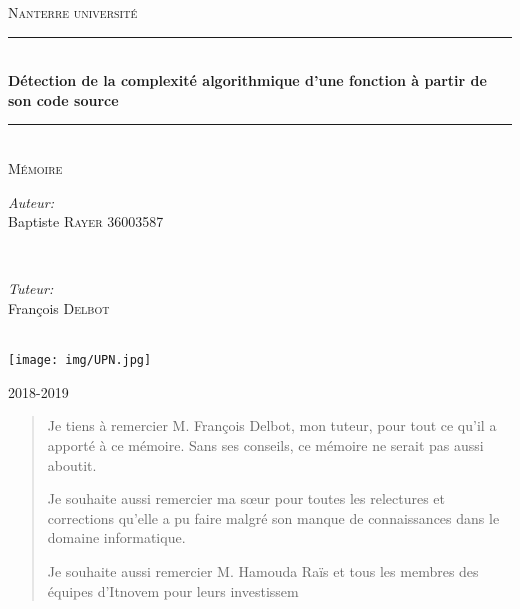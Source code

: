 \documentclass[12pt, twoside, openright]{report}
\begin{document}
\begin{titlepage}

\newcommand{\HRule}{\rule{\linewidth}{0.5mm}} 
\center
 

\textsc{\LARGE Nanterre université}\\[1.5cm]
\HRule \\[0.4cm]
{ \huge \bfseries Détection de la complexité algorithmique d'une fonction à partir de son code source }\\[0.4cm]
\HRule \\[1.5cm]
 \textsc{\Large Mémoire }\\[0.5cm]

\begin{minipage}{0.4\textwidth}
\begin{center} \large
\emph{Auteur:}\\
Baptiste \textsc{Rayer} 36003587
\end{center}
\end{minipage}\\[0.5cm]

\begin{minipage}{0.4\textwidth}
\begin{center} \large
\emph{Tuteur:} \\
François \textsc{Delbot}
\end{center}
\end{minipage}\\[4cm]

\texttt{[image: img/UPN.jpg]}
\\[2cm]
\begin{center}
2018-2019    
\end{center}

\vfill 

\end{titlepage}

\thispagestyle{empty}
\renewcommand{\abstractname}{Remerciements}
\begin{abstract}

Je tiens à remercier M. François Delbot, mon tuteur, pour tout ce qu'il a apporté à ce mémoire. Sans ses conseils, ce mémoire ne serait pas aussi aboutit.

\vspace{0.4cm}
Je souhaite aussi remercier ma s\oe{}ur pour toutes les relectures et corrections qu'elle a pu faire malgré son manque de connaissances dans le domaine informatique.

\vspace{0.4cm}
Je souhaite aussi remercier M. Hamouda Raïs et tous les membres des équipes d'Itnovem pour leurs investissem
\end{abstract}
\thispagestyle{empty}
\end{document}
